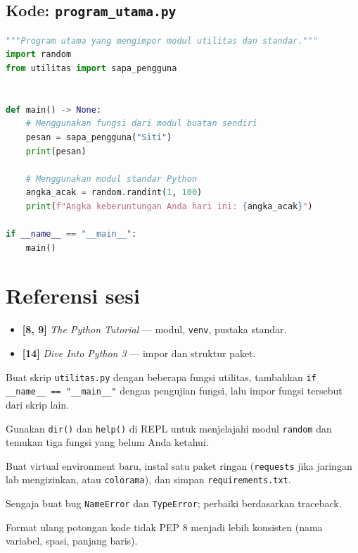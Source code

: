 \documentclass[../main.tex]{subfiles}
\begin{document}
\subsection{Kode: \texttt{program\_utama.py}}
\begin{lstlisting}[language=Python,caption={\texttt{program\_utama.py}}]
"""Program utama yang mengimpor modul utilitas dan standar."""
import random
from utilitas import sapa_pengguna


def main() -> None:
    # Menggunakan fungsi dari modul buatan sendiri
    pesan = sapa_pengguna("Siti")
    print(pesan)
    
    # Menggunakan modul standar Python
    angka_acak = random.randint(1, 100)
    print(f"Angka keberuntungan Anda hari ini: {angka_acak}")

if __name__ == "__main__":
    main()
\end{lstlisting}

\section{Referensi sesi}

\begin{itemize}[leftmargin=*]
  \item \textbf{[8, 9]} \textit{The Python Tutorial} --- modul, \texttt{venv}, pustaka standar.
  \item \textbf{[14]} \textit{Dive Into Python 3} --- impor dan struktur paket.
\end{itemize}

\begin{aktivitas}
  \item Buat skrip \texttt{utilitas.py} dengan beberapa fungsi utilitas, tambahkan \texttt{if \_\_name\_\_ == "\_\_main\_\_"} dengan pengujian fungsi, lalu impor fungsi tersebut dari skrip lain.
  \item Gunakan \texttt{dir()} dan \texttt{help()} di REPL untuk menjelajahi modul \texttt{random} dan temukan tiga fungsi yang belum Anda ketahui.
  \item Buat virtual environment baru, instal satu paket ringan (\texttt{requests} jika jaringan lab mengizinkan, atau \texttt{colorama}), dan simpan \texttt{requirements.txt}.
  \item Sengaja buat bug \texttt{NameError} dan \texttt{TypeError}; perbaiki berdasarkan traceback.
  \item Format ulang potongan kode tidak PEP 8 menjadi lebih konsisten (nama variabel, spasi, panjang baris).
\end{aktivitas}
\end{document}
